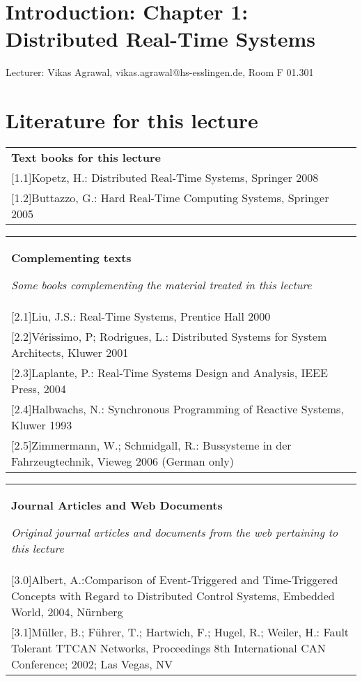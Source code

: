 \section{Introduction: Chapter 1: Distributed Real-Time Systems}


Lecturer: Vikas Agrawal, vikas.agrawal@hs-esslingen.de,
Room F 01.301

\section{Literature for this lecture}\label{literature-for-this-lecture}

\begin{longtable}[c]{@{}l@{}}
\toprule
\textbf{Text books for this lecture}\tabularnewline
{[}1.1{]}Kopetz, H.: Distributed Real-Time Systems, Springer 2008\tabularnewline
{[}1.2{]}Buttazzo, G.: Hard Real-Time Computing Systems, Springer 2005\tabularnewline
\bottomrule
\end{longtable}

\begin{longtable}[c]{@{}l@{}}
\toprule
\textbf{Complementing texts}

\emph{Some books complementing the material treated in this lecture}\tabularnewline
{[}2.1{]}Liu, J.S.: Real-Time Systems, Prentice Hall 2000\tabularnewline
{[}2.2{]}Vérissimo, P; Rodrigues, L.: Distributed Systems for System Architects, Kluwer 2001\tabularnewline
{[}2.3{]}Laplante, P.: Real-Time Systems Design and Analysis, IEEE Press, 2004\tabularnewline
{[}2.4{]}Halbwachs, N.: Synchronous Programming of Reactive Systems, Kluwer 1993\tabularnewline
{[}2.5{]}Zimmermann, W.; Schmidgall, R.: Bussysteme in der Fahrzeugtechnik, Vieweg 2006 (German only)\tabularnewline
\bottomrule
\end{longtable}

\begin{longtable}[c]{@{}l@{}}
\toprule
\textbf{Journal Articles and Web Documents}

\emph{Original journal articles and documents from the web pertaining to this lecture}\tabularnewline
{[}3.0{]}Albert, A.:Comparison of Event-Triggered and Time-Triggered Concepts with Regard to Distributed Control Systems, Embedded World, 2004, Nürnberg\tabularnewline
{[}3.1{]}Müller, B.; Führer, T.; Hartwich, F.; Hugel, R.; Weiler, H.: Fault Tolerant TTCAN Networks, Proceedings 8th International CAN Conference; 2002; Las Vegas, NV\tabularnewline
\bottomrule
\end{longtable}


